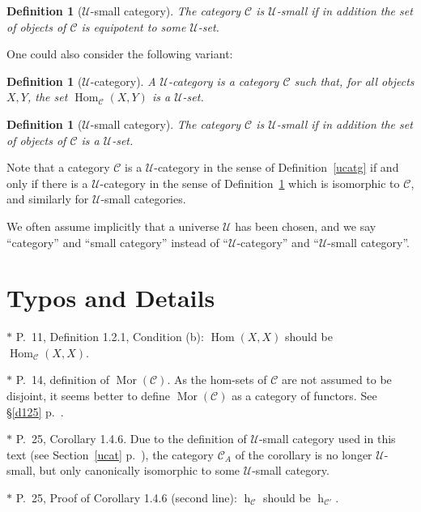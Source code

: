 \documentclass[12pt]{article}
\newtheorem{df}[thm]{Definition}
\theoremstyle{remark}
\theoremstyle{definition}
\newcommand{\nn}{\noindent}
\newcommand{\C}{\mathcal C}
\newcommand{\U}{\mathcal U}
\DeclareMathOperator{\hy}{h}
\DeclareMathOperator{\Hom}{Hom}
\DeclareMathOperator{\Mor}{Mor}
\begin{document}
\begin{df}[$\U$-small category] 
The category $\C$ is $\U$-{\em small} if in addition the set of objects of $\C$ is equipotent to some $\U$-set. 
\end{df} 

One could also consider the following variant: 

\begin{df}[$\U$-category]\label{myucat} 
A $\U$-{\em category} is a category $\C$ such that, for all objects $X,Y$, the set $\Hom_\C(X,Y)$ is a $\U$-set. 
\end{df} 

\begin{df}[$\U$-small category]\label{myuscat}
The category $\C$ is $\U$-{\em small}\index{$\U$-small category} if in addition the set of objects of $\C$ is a $\U$-set. 
\end{df} 

Note that a category $\C$ is a $\U$-category in the sense of Definition~\ref{ucatg} if and only if there is a $\U$-category in the sense of Definition~\ref{myucat} which is isomorphic to $\C$, and similarly for $\U$-small categories. 
%
\begin{center}
\end{center}

We often assume implicitly that a universe $\U$ has been chosen, and we say ``category'' and ``small category'' instead of ``$\U$-category'' and ``$\U$-small category''.


\section{Typos and Details}

$*$ P.~11, Definition 1.2.1, Condition (b): $\Hom(X,X)$ should be $\Hom_{\C}(X,X)$. 

\nn$*$ P.~14, definition of $\Mor(\C)$. As the hom-sets of $\C$ are not assumed to be disjoint, it seems better to define $\Mor(\C)$ as a category of functors. See \S\ref{d125} p.~\pageref{d125}. 

\nn$*$ P.~25, Corollary 1.4.6. Due to the definition of $\U$-small category used in this text (see Section~\ref{ucat} p.~\pageref{ucat}), the category $\C_A$ of the corollary is no longer $\U$-small, but only canonically isomorphic to some $\U$-small category. 

\nn$*$ P.~25, Proof of Corollary 1.4.6 (second line): $\hy_{\C}$ should be $\hy_{\C'}$. 
\end{document}
